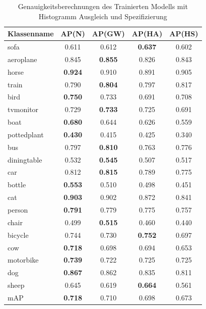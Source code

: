 \documentclass[a4paper,12pt,oneside]{article}
\begin{document}
\begin{table}
[h]
\caption{Genauigkeitsberechnungen des Trainierten Modells mit Histogramm Ausgleich und Spezifizierung}
\centering
\begin{tabular}{|l|c|c|c|c|}
\hline
Klassenname & AP(N) & AP(GW) & AP(HA) & AP(HS)\\
\hline
sofa & 0.611 & 0.612 & \textbf{0.637} & 0.602\\ 
aeroplane & 0.845 & \textbf{0.855} & 0.826 & 0.843\\
horse & \textbf{0.924} & 0.910 & 0.891 & 0.905\\
train & 0.790 & \textbf{0.804} & 0.797 & 0.817\\
bird & \textbf{0.750} & 0.733 & 0.691 & 0.708\\ 
tvmonitor & 0.729 & \textbf{0.733} & 0.725 & 0.691\\
boat & \textbf{0.680} & 0.644 & 0.626 & 0.559\\
pottedplant & \textbf{0.430} & 0.415 & 0.425 & 0.340\\
bus & 0.797 & \textbf{0.810} & 0.763 & 0.776\\ 
diningtable & 0.532 & \textbf{0.545} & 0.507 & 0.517\\
car & 0.812 & \textbf{0.815} & 0.789 & 0.775\\
bottle & \textbf{0.553} & 0.510 & 0.498 & 0.451\\
cat & \textbf{0.903} & 0.902 & 0.872 & 0.841\\
person & \textbf{0.791} & 0.779 & 0.775 & 0.757\\
chair & 0.499 & \textbf{0.515} & 0.460 & 0.440\\
bicycle & 0.744 & 0.730 & \textbf{0.752} & 0.697\\
cow & \textbf{0.718} & 0.698 & 0.694 & 0.653\\
motorbike & \textbf{0.739} & 0.722 & 0.725 & 0.725\\
dog & \textbf{0.867} & 0.862 & 0.835 & 0.811\\
sheep & 0.645 & 0.619 & \textbf{0.664} & 0.561\\
\hline
mAP & \textbf{0.718} & 0.710 & 0.698 & 0.673\\
\hline
\end{tabular}
\end{table}
\end{document}
